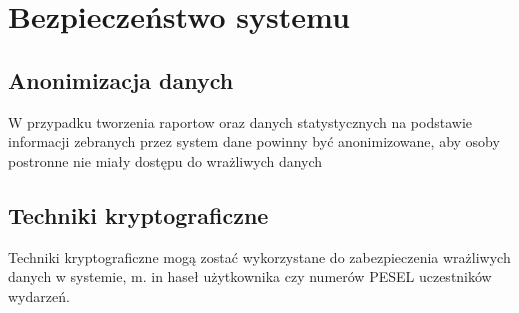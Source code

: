 \newpage\section{Bezpieczeństwo systemu \NazwaSys} \label{sec:bezpieczenstwo}
\subsection{Anonimizacja danych}
W przypadku tworzenia raportow oraz danych statystycznych na podstawie informacji zebranych przez system dane powinny być anonimizowane, aby osoby postronne nie miały dostępu do wrażliwych danych
\subsection{Techniki kryptograficzne}
Techniki kryptograficzne mogą zostać wykorzystane do zabezpieczenia wrażliwych danych w systemie, m. in haseł użytkownika czy numerów PESEL uczestników wydarzeń.

 
